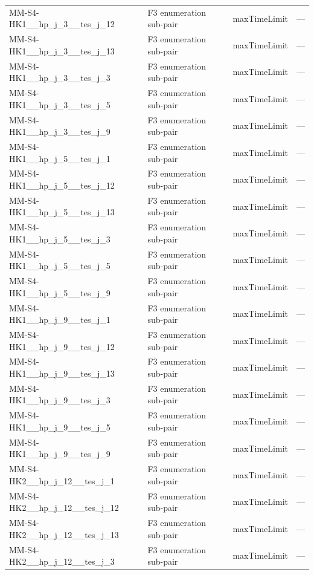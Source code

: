 \begin{table}[htbp]
\begin{tabular}{lllr}
  MM-S4-HK1\_\_hp\_j\_3\_\_tes\_j\_12 & F3 enumeration sub-pair & maxTimeLimit & — \\
  MM-S4-HK1\_\_hp\_j\_3\_\_tes\_j\_13 & F3 enumeration sub-pair & maxTimeLimit & — \\
  MM-S4-HK1\_\_hp\_j\_3\_\_tes\_j\_3 & F3 enumeration sub-pair & maxTimeLimit & — \\
  MM-S4-HK1\_\_hp\_j\_3\_\_tes\_j\_5 & F3 enumeration sub-pair & maxTimeLimit & — \\
  MM-S4-HK1\_\_hp\_j\_3\_\_tes\_j\_9 & F3 enumeration sub-pair & maxTimeLimit & — \\
  MM-S4-HK1\_\_hp\_j\_5\_\_tes\_j\_1 & F3 enumeration sub-pair & maxTimeLimit & — \\
  MM-S4-HK1\_\_hp\_j\_5\_\_tes\_j\_12 & F3 enumeration sub-pair & maxTimeLimit & — \\
  MM-S4-HK1\_\_hp\_j\_5\_\_tes\_j\_13 & F3 enumeration sub-pair & maxTimeLimit & — \\
  MM-S4-HK1\_\_hp\_j\_5\_\_tes\_j\_3 & F3 enumeration sub-pair & maxTimeLimit & — \\
  MM-S4-HK1\_\_hp\_j\_5\_\_tes\_j\_5 & F3 enumeration sub-pair & maxTimeLimit & — \\
  MM-S4-HK1\_\_hp\_j\_5\_\_tes\_j\_9 & F3 enumeration sub-pair & maxTimeLimit & — \\
  MM-S4-HK1\_\_hp\_j\_9\_\_tes\_j\_1 & F3 enumeration sub-pair & maxTimeLimit & — \\
  MM-S4-HK1\_\_hp\_j\_9\_\_tes\_j\_12 & F3 enumeration sub-pair & maxTimeLimit & — \\
  MM-S4-HK1\_\_hp\_j\_9\_\_tes\_j\_13 & F3 enumeration sub-pair & maxTimeLimit & — \\
  MM-S4-HK1\_\_hp\_j\_9\_\_tes\_j\_3 & F3 enumeration sub-pair & maxTimeLimit & — \\
  MM-S4-HK1\_\_hp\_j\_9\_\_tes\_j\_5 & F3 enumeration sub-pair & maxTimeLimit & — \\
  MM-S4-HK1\_\_hp\_j\_9\_\_tes\_j\_9 & F3 enumeration sub-pair & maxTimeLimit & — \\
  MM-S4-HK2\_\_hp\_j\_12\_\_tes\_j\_1 & F3 enumeration sub-pair & maxTimeLimit & — \\
  MM-S4-HK2\_\_hp\_j\_12\_\_tes\_j\_12 & F3 enumeration sub-pair & maxTimeLimit & — \\
  MM-S4-HK2\_\_hp\_j\_12\_\_tes\_j\_13 & F3 enumeration sub-pair & maxTimeLimit & — \\
  MM-S4-HK2\_\_hp\_j\_12\_\_tes\_j\_3 & F3 enumeration sub-pair & maxTimeLimit & — \\

\end{tabular}
\end{table}
